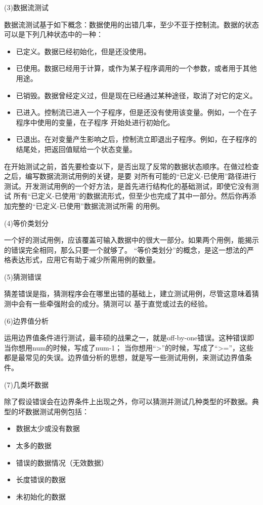 \documentclass{article}
\begin{document}
\par
(3)数据流测试
\par
数据流测试基于如下概念：数据使用的出错几率，至少不亚于控制流。数据的状态可以是下列几种状态中的一种：
\begin{itemize}
    \item 已定义。数据已经初始化，但是还没使用。
    \item 已使用。数据已经用于计算，或作为某子程序调用的一个参数，或者用于其他用途。
    \item 已销毁。数据曾经定义过，但是现在已经通过某种途径，取消了对它的定义。
    \item 已进入。控制流已进入一个子程序，但是还没有使用该变量。例如，一个在子程序中使用的变量，在子程序
    开始处进行初始化。
    \item 已退出。在对变量产生影响之后，控制流立即退出子程序。例如，在子程序的结尾处，把返回值赋给一个状态变量。
\end{itemize}
在开始测试之前，首先要检查以下，是否出现了反常的数据状态顺序。在做过检查之后，编写数据流测试用例的关键，是要
对所有可能的“已定义-已使用”路径进行测试。开发测试用例的一个好方法，是首先进行结构化的基础测试，即使它没有测试
所有“已定义-已使用”的数据流形式，但至少也完成了其中一部分。然后你再添加完整的“已定义-已使用”数据流测试所需
的用例。

\par
(4)等价类划分
\par
一个好的测试用例，应该覆盖可输入数据中的很大一部分。如果两个用例，能揭示的错误完全相同，那么只要一个就够了。
“等价类划分”的概念，是这一想法的严格表达形式，应用它有助于减少所需用例的数量。

\par
(5)猜测错误
\par
猜差错误是指，猜测程序会在哪里出错的基础上，建立测试用例，尽管这意味着猜测中会有一些牵强附会的成分。猜测可以
基于直觉或过去的经验。

\par
(6)边界值分析
\par
运用边界值条件进行测试，最丰硕的战果之一，就是off-by-one错误。这种错误即当你想用num的时候，写成了num-1；
当你想用“>”的时候，写成了“>=”，这些都是最常见的失误。边界值分析的思想，就是写一些测试用例，来测试边界值条件。

\par
(7)几类坏数据
\par
除了假设错误会在边界条件上出现之外，你可以猜测并测试几种类型的坏数据。典型的坏数据测试用例包括：
\begin{itemize}
    \item 数据太少或没有数据
    \item 太多的数据
    \item 错误的数据情况（无效数据）
    \item 长度错误的数据
    \item 未初始化的数据
\end{itemize}
\end{document}
